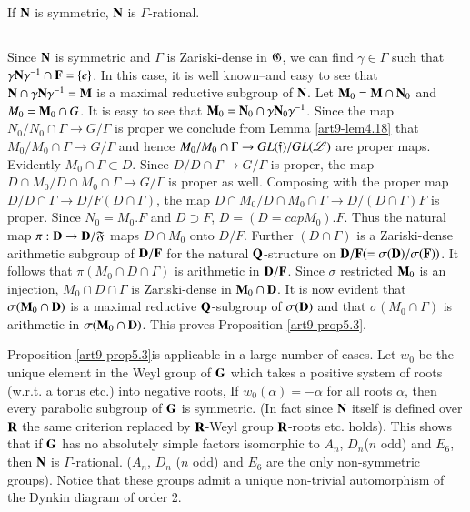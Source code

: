 \begin{proposition}\label{art9-prop5.3}
If $\mathbf{N}$ is symmetric, $\mathbf{N}$ is $\Gamma$-rational.
\end{proposition}

\subsection{}\label{art9-subsec5.4}
Since $\mathbf{N}$ is symmetric and $\Gamma$ is Zariski-dense in $\mathfrak{G}$, we can find $\gamma \in\Gamma$ such that $\gamma \mathbf{N} \gamma^{-1} \cap\mathbf{F} = \{e\}$. In this case, it is well known--and easy to see that $\mathbf{N} \cap \gamma \mathbf{N} \gamma^{-1} = \mathbf{M}$ is a maximal reductive subgroup of $\mathbf{N}$. Let $\mathbf{M}_0 = \mathbf{M} \cap \mathbf{N}_0$ and $M_0 = \mathbf{M}_0 \cap G$. It is easy to see that $\mathbf{M}_0 = \mathbf{N}_0 \cap \gamma \mathbf{N}_0 \gamma^{-1}$. Since the map $N_0/ N_0 \cap \Gamma\to G/ \Gamma $ is proper we conclude from Lemma \ref{art9-lem4.18} that $M_0 / M_0 \cap \Gamma \to G/\Gamma$ and hence $M_0 / M_0 \cap \Gamma \to G  L(\mathfrak{f}) / GL (\mathscr{L})$ are proper maps. Evidently $M_0 \cap \Gamma \subset D$. Since $D/ D \cap \Gamma \to G / \Gamma$ is proper, the map $D \cap M_0 / D \cap M_0 \cap \Gamma \to G / \Gamma$ is proper as well. Composing with the proper map $D/D \cap \Gamma \to D/ F (D \cap \Gamma)$, the map $D \cap M_0 / D \cap M_0 \cap \Gamma \to D / (D \cap \Gamma) F$ is proper. Since $N_0 = M_0 . F$ and $D \supset F$, $D = (D =cap M_0) . F$. Thus the natural map $\pi : \mathbf{D} \to \mathbf{D} / \mathfrak{F}$ maps $D \cap M_0$  onto $D/ F$. Further $(D \cap \Gamma)$ is a Zariski-dense arithmetic subgroup of $\mathbf{D}/\mathbf{F}$ for the natural $\mathbf{Q}$-structure on $\mathbf{D} / \mathbf{F} (= \sigma (\mathbf{D})/ \sigma (\mathbf{F}))$. It follows that $\pi (M_0 \cap D \cap \Gamma)$ is arithmetic in $\mathbf{D}/\mathbf{F}$. Since $\sigma$ restricted $\mathbf{M}_0$ is an injection, $M_0 \cap D \cap \Gamma$ is Zariski-dense in $\mathbf{M}_0 \cap \mathbf{D}$. It is now evident that $\sigma (\mathbf{M}_0 \cap \mathbf{D})$ is a maximal reductive $\mathbf{Q}$-subgroup of $\sigma (\mathbf{D})$ and that $\sigma (M_0 \cap \Gamma)$ is arithmetic in $\sigma (\mathbf{M}_0 \cap \mathbf{D})$. This proves Proposition \ref{art9-prop5.3}.

\begin{remarks}\label{art9-remarks5.5}
Proposition \ref{art9-prop5.3}\pageoriginale is applicable in a large number of cases. Let $w_0$ be the unique element in the Weyl group of $\mathbf{G}$ which takes a positive system of roots (w.r.t. a torus etc.) into negative roots, If $w_0 (\alpha) = - \alpha$ for all roots $\alpha$, then every parabolic subgroup of $\mathbf{G}$ is symmetric. (In fact since $\mathbf{N}$ itself is defined over $\mathbf{R}$ the same criterion replaced by $\mathbf{R}$-Weyl group $\mathbf{R}$-roots etc. holds). This shows that if $\mathbf{G}$ has no absolutely simple factors isomorphic to $A_n$, $D_n$($n$ odd) and $E_6$, then $\mathbf{N}$ is $\Gamma$-rational. (\ie $A_n$, $D_n$ ($n$ odd) and $E_6$ are the only non-symmetric groups). Notice that these groups admit a unique non-trivial automorphism of the Dynkin diagram of order 2.
\end{remarks}

